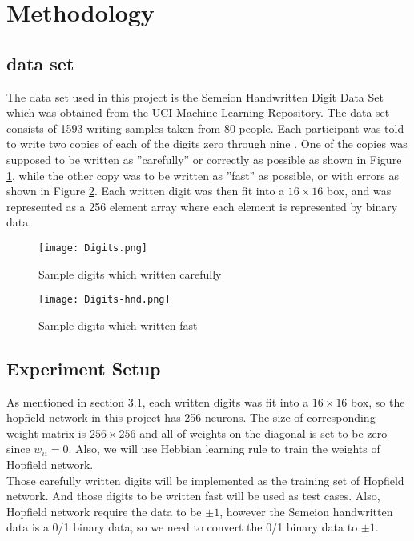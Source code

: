 \section{Methodology}
\subsection{data set}
The data set used in this project is the Semeion Handwritten Digit Data Set which was obtained from the UCI Machine Learning Repository. The data set consists of 1593 writing samples taken from 80 people. Each participant was told to write two copies of each of the digits zero through nine . One of the copies was supposed to be written as ”carefully” or correctly as possible as shown in Figure \ref{fg:ds1}, while the other copy was to be written as ”fast” as possible, or with errors as shown in Figure \ref{fg:ds2}. Each written digit was then fit into a $16 \times 16$ box, and was represented as a 256 element array where each element is represented by binary data.\\

\begin{figure}[h]
\centering
\texttt{[image: Digits.png]}
\caption{Sample digits which written carefully}
\label{fg:ds1}
\end{figure}

\begin{figure}[h]
\centering
\texttt{[image: Digits-hnd.png]}
\caption{Sample digits which written fast}
\label{fg:ds2}
\end{figure}

\subsection{Experiment Setup}
As mentioned in section 3.1, each written digits was fit into a $16 \times 16$ box, so the hopfield network in this project has 256 neurons. The size of corresponding weight matrix is $256 \times 256$ and all of weights on the diagonal is set to be zero since $w_{ii} = 0$. Also, we will use Hebbian learning rule to train the weights of Hopfield network.\\

Those carefully written digits will be implemented as the training set of Hopfield network. And those digits to be written fast will be used as test cases. Also, Hopfield network require the data to be $\pm 1$, however the Semeion handwritten data is a 0/1 binary data, so we need to convert the 0/1 binary data to $\pm 1$. \\

